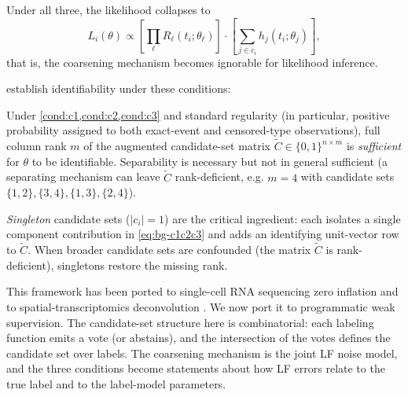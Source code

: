 Under all three, the likelihood collapses to
\begin{equation}
  L_i(\theta) \propto \left[\prod_\ell R_\ell(t_i;\theta_\ell)\right]
  \cdot \left[\sum_{j \in c_i} h_j(t_i; \theta_j)\right],
  \label{eq:bg-c1c2c3}
\end{equation}
that is, the coarsening mechanism becomes ignorable for likelihood
inference.

\citet[Theorem 8]{towell2026masked} establish identifiability under
these conditions:

\begin{theorem}
\label{thm:bg-id}
Under \cref{cond:c1,cond:c2,cond:c3} and standard regularity
(in particular, positive probability assigned to both exact-event
and censored-type observations), full column rank $m$ of the
augmented candidate-set matrix $\tilde{C} \in \{0,1\}^{n \times m}$
is \emph{sufficient} for $\theta$ to be identifiable. Separability
is necessary but not in general sufficient (a separating mechanism
can leave $\tilde{C}$ rank-deficient, e.g. $m=4$ with candidate
sets $\{1,2\},\{3,4\},\{1,3\},\{2,4\}$).
\end{theorem}

\emph{Singleton} candidate sets ($|c_i|=1$) are the critical
ingredient: each isolates a single component contribution in
\eqref{eq:bg-c1c2c3} and adds an identifying unit-vector row to
$\tilde{C}$. When broader candidate sets are confounded (the matrix
$\tilde{C}$ is rank-deficient), singletons restore the missing rank.

This framework has been ported to single-cell RNA sequencing zero
inflation \citep{towell2026scrnacoarsening} and to
spatial-transcriptomics deconvolution
\citep{towell2026spatialcoarsening}. We now port it to programmatic
weak supervision. The candidate-set structure here is combinatorial:
each labeling function emits a vote (or abstains), and the
intersection of the votes defines the candidate set over labels. The
coarsening mechanism is the joint LF noise model, and the three
conditions become statements about how LF errors relate to the true
label and to the label-model parameters.
